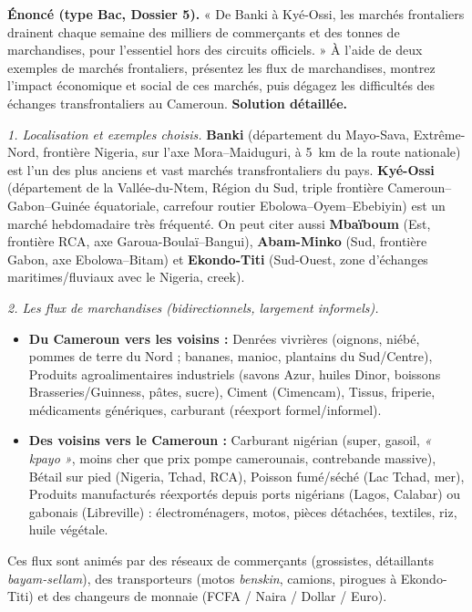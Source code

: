 \documentclass[11pt]{article}
\begin{document}
\begin{exoresolu}
\textbf{Énoncé (type Bac, Dossier 5).} « De Banki à Kyé-Ossi, les marchés frontaliers drainent chaque semaine des milliers de commerçants et des tonnes de marchandises, pour l'essentiel hors des circuits officiels. » À l'aide de deux exemples de marchés frontaliers, présentez les flux de marchandises, montrez l'impact économique et social de ces marchés, puis dégagez les difficultés des échanges transfrontaliers au Cameroun.
\tcblower
\textbf{Solution détaillée.}

\emph{1. Localisation et exemples choisis.}
\textbf{Banki} (département du Mayo-Sava, Extrême-Nord, frontière Nigeria, sur l'axe Mora--Maiduguri, à \SI{5}{km} de la route nationale) est l'un des plus anciens et vast marchés transfrontaliers du pays. \textbf{Kyé-Ossi} (département de la Vallée-du-Ntem, Région du Sud, triple frontière Cameroun--Gabon--Guinée équatoriale, carrefour routier Ebolowa--Oyem--Ebebiyin) est un marché hebdomadaire très fréquenté. On peut citer aussi \textbf{Mbaïboum} (Est, frontière RCA, axe Garoua-Boulaï--Bangui), \textbf{Abam-Minko} (Sud, frontière Gabon, axe Ebolowa--Bitam) et \textbf{Ekondo-Titi} (Sud-Ouest, zone d'échanges maritimes/fluviaux avec le Nigeria, creek).

\emph{2. Les flux de marchandises (bidirectionnels, largement informels).}
\begin{itemize}
\item \textbf{Du Cameroun vers les voisins :} Denrées vivrières (oignons, niébé, pommes de terre du Nord ; bananes, manioc, plantains du Sud/Centre), Produits agroalimentaires industriels (savons Azur, huiles Dinor, boissons Brasseries/Guinness, pâtes, sucre), Ciment (Cimencam), Tissus, friperie, médicaments génériques, carburant (réexport formel/informel).
\item \textbf{Des voisins vers le Cameroun :} Carburant nigérian (super, gasoil, \emph{« kpayo »}, moins cher que prix pompe camerounais, contrebande massive), Bétail sur pied (Nigeria, Tchad, RCA), Poisson fumé/séché (Lac Tchad, mer), Produits manufacturés réexportés depuis ports nigérians (Lagos, Calabar) ou gabonais (Libreville) : électroménagers, motos, pièces détachées, textiles, riz, huile végétale.
\end{itemize}
Ces flux sont animés par des réseaux de commerçants (grossistes, détaillants \emph{bayam-sellam}), des transporteurs (motos \emph{benskin}, camions, pirogues à Ekondo-Titi) et des changeurs de monnaie (FCFA / Naira / Dollar / Euro).


\end{exoresolu}
\end{document}
